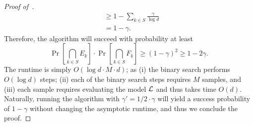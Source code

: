 \begin{proof}[Proof of~]
\begin{align*}
	&\geq 1 - \sum_{k \in S} \frac{\gamma}{\log d}\\
	&= 1 - \gamma.
\end{align*}
Therefore, the algorithm will succeed with probability at least 
\[ 
	\Pr\left[\bigcap_{k \in S} E_k\right] \cdot \Pr\left[\bigcap_{k \in S} F_k\right] \geq (1-\gamma)^2 \geq 1-2\gamma.
\]
The runtime is simply
$O(\log d \cdot M \cdot d  )$; as (i) the binary search performs $O(\log d)$ steps; (ii) each of the binary search steps requires $M$ samples, and (iii) each sample requires evaluating the model $\mathcal{L}$ and thus takes time $O(d)$. Naturally, running the algorithm with $\gamma' = 1/2 \cdot \gamma$ will yield a success probability of $1-\gamma$ without changing the asymptotic runtime, and thus we conclude the proof.




\end{proof}
